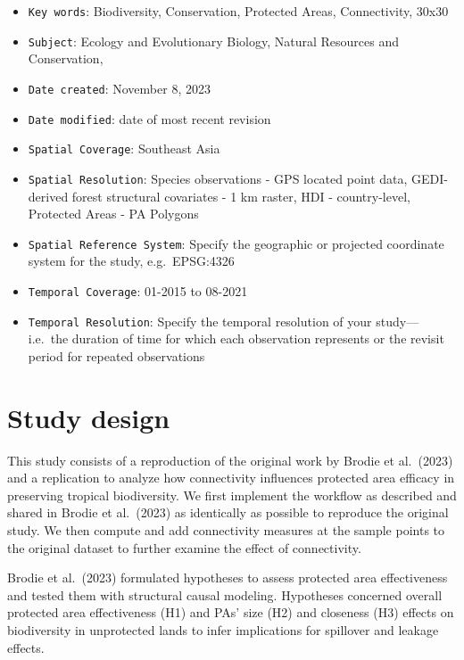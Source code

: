 \documentclass[
]{article}
\providecommand{\tightlist}{%
  \setlength{\itemsep}{0pt}\setlength{\parskip}{0pt}}
\begin{document}
\begin{itemize}
\tightlist
\item
  \texttt{Key\ words}: Biodiversity, Conservation, Protected Areas,
  Connectivity, 30x30
\item
  \texttt{Subject}: Ecology and Evolutionary Biology, Natural Resources
  and Conservation,
\item
  \texttt{Date\ created}: November 8, 2023
\item
  \texttt{Date\ modified}: date of most recent revision
\item
  \texttt{Spatial\ Coverage}: Southeast Asia
\item
  \texttt{Spatial\ Resolution}: Species observations - GPS located point
  data, GEDI-derived forest structural covariates - 1 km raster, HDI -
  country-level, Protected Areas - PA Polygons
\item
  \texttt{Spatial\ Reference\ System}: Specify the geographic or
  projected coordinate system for the study, e.g.~EPSG:4326
\item
  \texttt{Temporal\ Coverage}: 01-2015 to 08-2021
\item
  \texttt{Temporal\ Resolution}: Specify the temporal resolution of your
  study---i.e.~the duration of time for which each observation
  represents or the revisit period for repeated observations
\end{itemize}

\hypertarget{study-design}{%
\section{Study design}\label{study-design}}

This study consists of a reproduction of the original work by Brodie et
al.~(2023) and a replication to analyze how connectivity influences
protected area efficacy in preserving tropical biodiversity. We first
implement the workflow as described and shared in Brodie et al.~(2023)
as identically as possible to reproduce the original study. We then
compute and add connectivity measures at the sample points to the
original dataset to further examine the effect of connectivity.

Brodie et al.~(2023) formulated hypotheses to assess protected area
effectiveness and tested them with structural causal modeling.
Hypotheses concerned overall protected area effectiveness (H1) and PAs'
size (H2) and closeness (H3) effects on biodiversity in unprotected
lands to infer implications for spillover and leakage effects.
\end{document}
